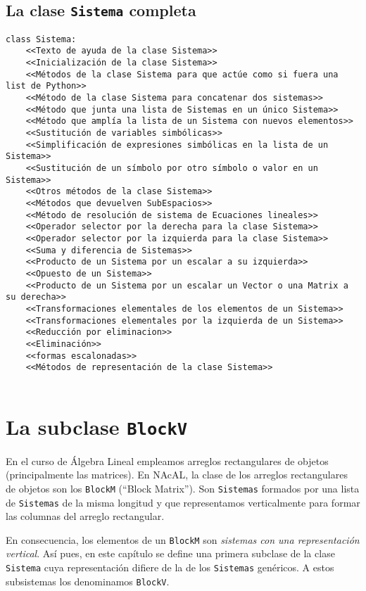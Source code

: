 \documentclass[11pt]{report}
\begin{document}
\clearpage

\section{La clase \texttt{Sistema} completa}
\label{sec:org4293eaf}

\begin{verbatim}
class Sistema:
    <<Texto de ayuda de la clase Sistema>>
    <<Inicialización de la clase Sistema>>
    <<Métodos de la clase Sistema para que actúe como si fuera una list de Python>>
    <<Método de la clase Sistema para concatenar dos sistemas>>
    <<Método que junta una lista de Sistemas en un único Sistema>>
    <<Método que amplía la lista de un Sistema con nuevos elementos>>
    <<Sustitución de variables simbólicas>>
    <<Simplificación de expresiones simbólicas en la lista de un Sistema>>
    <<Sustitución de un símbolo por otro símbolo o valor en un Sistema>>
    <<Otros métodos de la clase Sistema>>
    <<Métodos que devuelven SubEspacios>>
    <<Método de resolución de sistema de Ecuaciones lineales>>
    <<Operador selector por la derecha para la clase Sistema>>
    <<Operador selector por la izquierda para la clase Sistema>>
    <<Suma y diferencia de Sistemas>>
    <<Producto de un Sistema por un escalar a su izquierda>>
    <<Opuesto de un Sistema>>
    <<Producto de un Sistema por un escalar un Vector o una Matrix a su derecha>>
    <<Transformaciones elementales de los elementos de un Sistema>>
    <<Transformaciones elementales por la izquierda de un Sistema>>
    <<Reducción por eliminacion>>
    <<Eliminación>>
    <<formas escalonadas>>
    <<Métodos de representación de la clase Sistema>>
    
\end{verbatim}


\chapter{La subclase \texttt{BlockV}}
\label{sec:org749016b}

En el curso de Álgebra Lineal empleamos arreglos rectangulares de
objetos (principalmente las matrices). En NAcAL, la clase de los
arreglos rectangulares de objetos son los \texttt{BlockM} (``Block
Matrix''). Son \texttt{Sistemas} formados por una lista de \texttt{Sistemas} de la
misma longitud y que representamos verticalmente para formar las
columnas del arreglo rectangular.

En consecuencia, los elementos de un \texttt{BlockM} son \emph{sistemas con una
representación vertical}. Así pues, en este capítulo se define una
primera subclase de la clase \texttt{Sistema} cuya representación difiere de
la de los \texttt{Sistemas} genéricos. A estos subsistemas los denominamos
\texttt{BlockV}.
\end{document}
